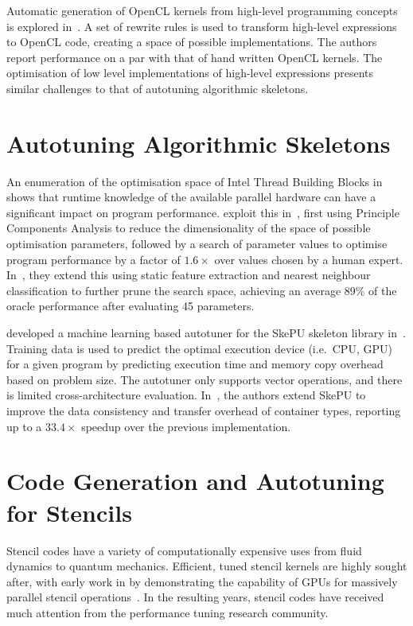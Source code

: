 Automatic generation of OpenCL kernels from high-level programming
concepts is explored in~\cite{Steuwer2015}. A set of rewrite rules is
used to transform high-level expressions to OpenCL code, creating a
space of possible implementations. The authors report performance on a
par with that of hand written OpenCL kernels. The optimisation of low
level implementations of high-level expressions presents similar
challenges to that of autotuning algorithmic skeletons.


\section{Autotuning Algorithmic Skeletons}

An enumeration of the optimisation space of Intel Thread Building
Blocks in~\cite{Contreras2008} shows that runtime knowledge of the
available parallel hardware can have a significant impact on program
performance. \citeauthor{Collins2012} exploit this
in~\cite{Collins2012}, first using Principle Components Analysis to
reduce the dimensionality of the space of possible optimisation
parameters, followed by a search of parameter values to optimise
program performance by a factor of $1.6\times$ over values chosen by a
human expert. In~\cite{Collins2013}, they extend this using static
feature extraction and nearest neighbour classification to further
prune the search space, achieving an average 89\% of the oracle
performance after evaluating 45 parameters.

\citeauthor{Dastgeer2011} developed a machine learning based autotuner
for the SkePU skeleton library in~\cite{Dastgeer2011}. Training data
is used to predict the optimal execution device (i.e.\ CPU, GPU) for a
given program by predicting execution time and memory copy overhead
based on problem size. The autotuner only supports vector operations,
and there is limited cross-architecture
evaluation. In~\cite{Dastgeer2015a}, the authors extend SkePU to
improve the data consistency and transfer overhead of container types,
reporting up to a $33.4\times$ speedup over the previous
implementation.


\section{Code Generation and Autotuning for Stencils}

Stencil codes have a variety of computationally expensive uses from
fluid dynamics to quantum mechanics. Efficient, tuned stencil kernels
are highly sought after, with early work in \citeyear{Bolz2003} by
\citeauthor{Bolz2003} demonstrating the capability of GPUs for
massively parallel stencil operations~\cite{Bolz2003}. In the
resulting years, stencil codes have received much attention from the
performance tuning research community.

